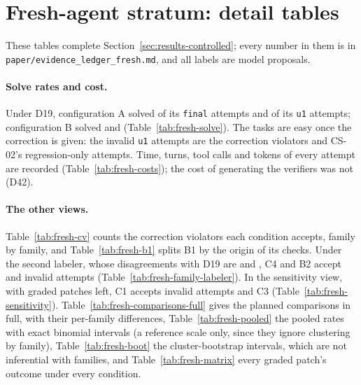\section{Fresh-agent stratum: detail tables}
\label{app:fresh}\suppressfloats[t]%
These tables complete Section~\ref{sec:results-controlled}; every number in them is in
\texttt{paper/evidence\_ledger\_fresh.md}, and all labels are model proposals.

\paragraph{Solve rates and cost.} Under D19, configuration A solved  of its \texttt{final} attempts and
 of its \texttt{u1} attempts; configuration B solved  and 
(Table~\ref{tab:fresh-solve}). The tasks are easy once the correction is given: the  invalid \texttt{u1}
attempts are the  correction violators and CS-02's  regression-only attempts. Time, turns, tool
calls and tokens of every attempt are recorded (Table~\ref{tab:fresh-costs}); the cost of generating the verifiers was not
(D42).

\paragraph{The other views.} Table~\ref{tab:fresh-cv} counts the correction violators each condition accepts, family by
family, and Table~\ref{tab:fresh-b1} splits B1 by the origin of its checks. Under the second labeler, whose disagreements
with D19 are \texttt{} and \texttt{}, C4 and B2 accept  and 
invalid attempts (Table~\ref{tab:fresh-family-labeler}). In the sensitivity view, with  graded patches
left, C1 accepts  invalid attempts and C3  (Table~\ref{tab:fresh-sensitivity}).
Table~\ref{tab:fresh-comparisons-full} gives the planned comparisons in full, with their per-family differences,
Table~\ref{tab:fresh-pooled} the pooled rates with exact binomial intervals (a reference scale only, since they ignore
clustering by family), Table~\ref{tab:fresh-boot} the cluster-bootstrap intervals, which are not inferential with
 families, and Table~\ref{tab:fresh-matrix} every graded patch's outcome under every condition.

